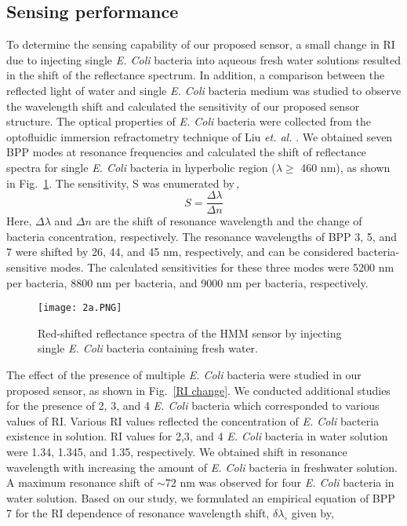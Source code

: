 \documentclass[conference]{IEEEtran}
\begin{document}
\subsection{Sensing performance}
To determine the sensing capability of our proposed sensor, a small change in RI due to injecting single \textit{E. Coli} bacteria into aqueous fresh water solutions resulted in the shift of the reflectance spectrum. In addition, a comparison between the reflected light of water and single \textit{E. Coli} bacteria medium was studied to observe the wavelength shift and calculated the sensitivity of our proposed sensor structure. The optical properties of \textit{E. Coli} bacteria were collected from the optofluidic immersion refractometry technique of Liu \textit{et. al.} \cite{Liu}. We obtained seven BPP modes at resonance frequencies and calculated the shift of reflectance spectra for single \textit{E. Coli} bacteria in hyperbolic region ($\lambda \geq$ 460 nm), as shown in Fig.~\ref{fig:5}. The sensitivity, S was enumerated by\,\cite{Ye},
\begin{equation}
    S = \frac{\Delta \lambda}{\Delta n}
    \label{Eq. 5}
\end{equation}
Here, $\Delta \lambda$ and $\Delta n$ are the shift of resonance wavelength and the change of bacteria concentration, respectively. The resonance wavelengths of BPP 3, 5, and 7 were shifted by 26, 44, and 45 nm, respectively, and can be considered bacteria-sensitive modes. The calculated sensitivities for these three modes were 5200 nm per bacteria, 8800 nm per bacteria, and 9000 nm per bacteria, respectively. 
\begin{figure}[ht]
\centering
\texttt{[image: 2a.PNG]}
\caption{Red-shifted reflectance spectra of the HMM sensor by injecting single \textit{E. Coli} bacteria containing fresh water.}
\label{fig:5}
\end{figure}
The effect of the presence of multiple \textit{E. Coli} bacteria were studied in our proposed sensor, as shown in Fig.~\ref{RI change}. We conducted additional studies for the presence of 2, 3, and 4 \textit{E. Coli} bacteria which corresponded to various values of RI. Various RI values reflected the concentration of \textit{E. Coli} bacteria existence in solution. RI values for 2,3, and 4 \textit{E. Coli} bacteria in water solution were 1.34, 1.345, and 1.35, respectively. We obtained shift in resonance wavelength with increasing the amount of \textit{E. Coli} bacteria in freshwater solution. A maximum resonance shift of $\sim$72 nm was observed for four \textit{E. Coli} bacteria in water solution. Based on our study, we formulated an empirical equation of BPP 7 for the RI dependence of resonance wavelength shift, $\delta \lambda_{\circ}$ given by,
\end{document}
